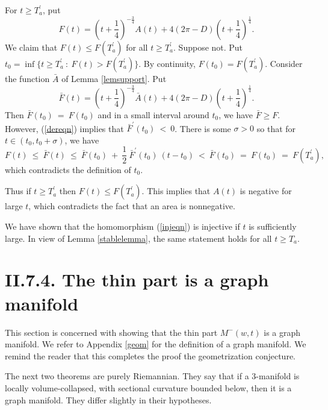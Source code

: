 For $t \ge T_a^\prime$, put
\begin{equation}
F(t) =
\left(t+\frac14\right)^{-\frac34} A(t) + 4 (2\pi-D) \left(t+\frac14\right)^{\frac14}.
\end{equation}
We claim that
$F(t) \le F(T_a^\prime)$ for all $t \ge T_a^\prime$. Suppose not.  Put
$t_0 = \inf \{t \ge T_a^\prime \: : \: F(t) > F(T_a^\prime) \}$.
By continuity, $F(t_0) = F(T_a^\prime)$.
Consider the function $\bar A$ of Lemma \ref{lemsupport}.
Put
\begin{equation}
\bar F(t) =  \left(t+\frac14\right)^{-\frac34} \bar A(t) + 4 (2\pi-D) \left(t+\frac14\right)^{\frac14}.
\end{equation}
Then $\bar F(t_0) \: = \: F(t_0)$ and
in a small interval around $t_0$, we have
$\bar F \ge F$. However, (\ref{dereqn}) implies that
$\bar F^\prime(t_0)
\: < \: 0$.
There is some $\sigma > 0$ so that
for $t \in (t_0, t_0 + \sigma)$, we have
\begin{equation}
F(t) \: \le \: \bar F (t) \: \le \: \bar F(t_0) \: + \: \frac12 \:
\bar F^\prime(t_0) \: (t - t_0) \:
< \: \bar F(t_0) \: = \: F(t_0) \: = \: F(T_a^\prime),
\end{equation}
which contradicts the definition of $t_0$.

Thus if $t \ge T_a^\prime$ then
$F(t) \le F(T_a^\prime)$. This implies that
$A(t)$ is negative for large $t$, which contradicts the fact
that an area is nonnegative.


We have shown that the homomorphism (\ref{injeqn}) is injective if $t$ is sufficiently large.
In view of Lemma \ref{stablelemma}, the same statement holds for all $t \ge T_a$.
\endgroup\par\medskip

\section{II.7.4. The thin part is a graph manifold} \label{II.7.4}

This section is concerned with showing that the thin part
$M^-(w,t)$ is a graph manifold.  We refer to Appendix \ref{geom}
for the definition of a graph manifold.
We remind the reader that this completes the proof the geometrization
conjecture.

The next two theorems are purely Riemannian. They say that if a $3$-manifold
is locally volume-collapsed, with sectional curvature bounded below, then it
is a graph manifold. They differ slightly in their hypotheses.

